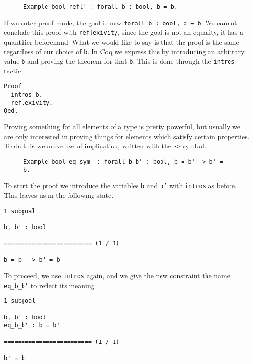 \begin{figure}[!ht]
\begin{verbatim}
Example bool_refl' : forall b : bool, b = b.
\end{verbatim}
\label{lst:bool-eq-refl}
\end{figure}

If we enter proof mode, the goal is now \texttt{forall b : bool, b = b}. We cannot conclude this
proof with \texttt{reflexivity}, since the goal is not an equality, it has a quantifier 
beforehand. What we would like to say is that the proof is the same regardless of our choice of 
\texttt{b}. In Coq we express this by introducing an arbitrary value \texttt{b} and
proving the theorem for that \texttt{b}. This is done through the \texttt{intros} 
tactic.

\begin{verbatim}
Proof.
  intros b.
  reflexivity.
Qed.
\end{verbatim}

Proving something for all elements of a type is pretty powerful, but usually we are only interested in
proving things for elements which satisfy certain properties. To do this we make use of implication,
written with the \texttt{->} symbol.
\begin{figure}[!ht]
\begin{verbatim}
Example bool_eq_sym' : forall b b' : bool, b = b' -> b' = b.
\end{verbatim}
\label{lst:bool-eq-sym}
\end{figure}

To start the proof we introduce the variables \texttt{b} and \texttt{b'} with 
\texttt{intros} as before. This leaves us in the following state.

\begin{verbatim}
1 subgoal

b, b' : bool

========================= (1 / 1)

b = b' -> b' = b
\end{verbatim}

To proceed, we use \texttt{intros} again, and we give the new constraint the name \texttt{eq_b_b'}
to reflect its meaning

\begin{verbatim}
1 subgoal

b, b' : bool
eq_b_b' : b = b'

========================= (1 / 1)

b' = b
\end{verbatim}

